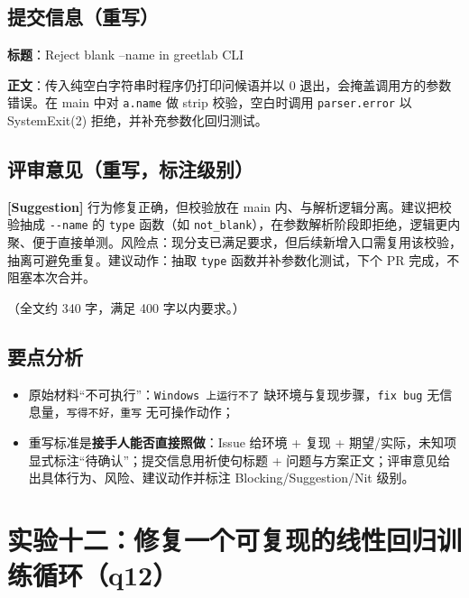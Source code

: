 \documentclass[UTF8,fontset=ubuntu]{ctexart}
\begin{document}
\subsection{提交信息（重写）}
\textbf{标题}：Reject blank --name in greetlab CLI

\textbf{正文}：传入纯空白字符串时程序仍打印问候语并以 0 退出，会掩盖调用方的参数错误。在 main 中对 \lstinline|a.name| 做 strip 校验，空白时调用 \lstinline|parser.error| 以 SystemExit(2) 拒绝，并补充参数化回归测试。

\subsection{评审意见（重写，标注级别）}
\textbf{[Suggestion]} 行为修复正确，但校验放在 main 内、与解析逻辑分离。建议把校验抽成 \lstinline|--name| 的 \lstinline|type| 函数（如 \lstinline|not_blank|），在参数解析阶段即拒绝，逻辑更内聚、便于直接单测。风险点：现分支已满足要求，但后续新增入口需复用该校验，抽离可避免重复。建议动作：抽取 \lstinline|type| 函数并补参数化测试，下个 PR 完成，不阻塞本次合并。

（全文约 340 字，满足 400 字以内要求。）

\subsection{要点分析}
\begin{itemize}
\item 原始材料“不可执行”：\lstinline|Windows 上运行不了| 缺环境与复现步骤，\lstinline|fix bug| 无信息量，\lstinline|写得不好，重写| 无可操作动作；
\item 重写标准是\textbf{接手人能否直接照做}：Issue 给环境 + 复现 + 期望/实际，未知项显式标注“待确认”；提交信息用祈使句标题 + 问题与方案正文；评审意见给出具体行为、风险、建议动作并标注 Blocking/Suggestion/Nit 级别。
\end{itemize}

\section{实验十二：修复一个可复现的线性回归训练循环（q12）}
\end{document}
